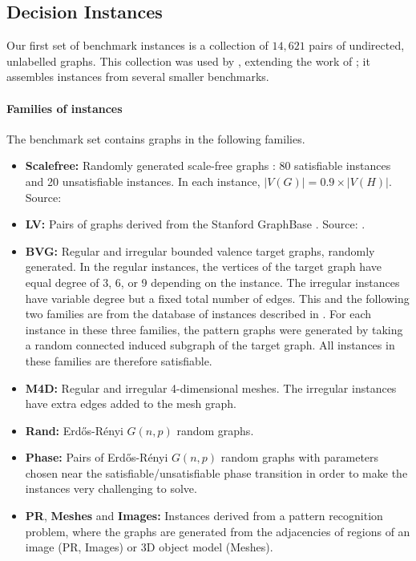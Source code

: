 \subsection{Decision Instances}\label{subsec:si-decision-experiment}

Our first set of benchmark instances is
a collection of $14,621$ pairs of undirected, unlabelled graphs.
This collection was used by \citet{DBLP:conf/cpaior/ArchibaldDHMP019},
extending the work of \citet{DBLP:conf/lion/KotthoffMS16};
it assembles instances from several smaller benchmarks.

\paragraph*{Families of instances} The benchmark set contains graphs
in the following families.

\begin{itemize}
    \item
        \textbf{Scalefree:} Randomly generated scale-free graphs \citep{DBLP:books/daglib/0012457}: 80
        satisfiable instances and 20 unsatisfiable instances.  In each instance,
        $|V(G)| = 0.9 \times |V(H)|$. Source: \citet{DBLP:journals/constraints/ZampelliDS10}
    \item
        \textbf{LV:} Pairs of graphs derived from the Stanford GraphBase \citep{DBLP:books/daglib/0071477}.
        Source: \cite{DBLP:journals/mscs/LarrosaV02}.
    \item \textbf{BVG:} Regular and irregular bounded valence target graphs, randomly generated.
        In the regular instances, the vertices of the target graph have equal degree of 3, 6, or 9
        depending on the instance.  The irregular instances have variable degree but a fixed total
        number of edges.
        This and the following two families are from the database
        of instances described in \citet{DBLP:journals/prl/SantoFSV03}.  For each instance in these
        three families, the pattern graphs were generated by taking a random connected
        induced subgraph of the target graph. All instances in these families are therefore satisfiable.
    \item \textbf{M4D:} Regular and irregular 4-dimensional meshes.  The irregular instances have
        extra edges added to the mesh graph.
    \item \textbf{Rand:} Erd\H{o}s-Rényi $G(n,p)$ random graphs.
    \item \textbf{Phase:} Pairs of Erd\H{o}s-Rényi $G(n,p)$ random graphs
        with parameters chosen near the satisfiable/unsatisfiable phase transition in order
        to make the instances very challenging to solve.
        \citep{DBLP:journals/jair/McCreeshPST18}
    \item \textbf{PR}, \textbf{Meshes} and \textbf{Images:} Instances derived from a pattern recognition problem, where
    	the graphs are generated from the adjacencies of regions of an image (PR, Images)
	or 3D object model (Meshes). \citep{DBLP:journals/pr/SolnonDHJ15,DBLP:journals/cviu/DamiandSHJS11}
\end{itemize}

